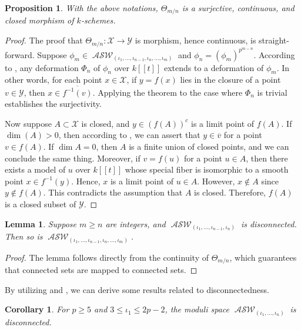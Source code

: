 \documentclass{compositio}
\newtheorem{proposition}[theorem]{Proposition}
\newtheorem{lemma}[theorem]{Lemma}
\newtheorem{corollary}[theorem]{Corollary}
\theoremstyle{remark}
\theoremstyle{remark}
\DeclareMathOperator{\ASW}{\mathcal{ASW}}
\begin{document}
\begin{proposition}
With the above notations, $\Theta_{m/n}$ is a surjective, continuous, and closed morphism of $k$-schemes.
\end{proposition}

\begin{proof}
The proof that $\Theta_{m/n}: \mathscr{X} \xrightarrow{} \mathscr{Y}$ is morphism, hence continuous, is straight-forward. Suppose $\phi_m \in \ASW_{(\iota_1, \ldots, \iota_{n-1}, \iota_n, \ldots, \iota_m)}$ and $\phi_n=(\phi_m)^{p^{m-n}}$. According to \cite[Theorem 1.2]{2020arXiv201013614D}, any deformation $\Phi_n$ of $\phi_n$ over $k[[t]]$ extends to a deformation of $\phi_m$. In other words, for each point $x \in \mathscr{X}$, if $y=f(x)$ lies in the closure of a point $v \in \mathscr{Y}$, then $x \in \overline{f^{-1}(v)}$. Applying the theorem to the case where $\Phi_n$ is trivial establishes the surjectivity.

Now suppose $A\subset \mathscr{X}$ is closed, and $y \in
(f(A))^c$ is a limit point of $f(A)$. If $\dim (A)>0$, then according to \cite[Proposition 3.2]{DANG2020398}, we can assert that $y \in \overline{v}$ for a point $v \in f(A)$. If $\dim A=0$, then $A$ is a finite union of closed points, and we can conclude the same thing. Moreover, if $v=f(u)$ for a point $u \in A$, then there exists a model of $u$ over $k[[t]]$ whose special fiber is isomorphic to a smooth point $x \in f^{-1}(y)$. Hence, $x$ is a limit point of $u \in A$. However, $x \not\in A$ since $y \not\in f(A)$. This contradicts the assumption that $A$ is closed. Therefore, $f(A)$ is a closed subset of $\mathscr{Y}$.
\end{proof}


\begin{lemma}
Suppose $m \ge n$ are integers, and $\ASW_{(\iota_1, \ldots, \iota_{n-1}, \iota_n)}$ is disconnected. Then so is $\ASW_{(\iota_1, \ldots, \iota_{n-1}, \iota_n, \ldots, \iota_m)}$.
\end{lemma}

\begin{proof}
The lemma follows directly from the continuity of $\Theta_{m/n}$, which guarantees that connected sets are mapped to connected sets.
\end{proof}

By utilizing \cite{2020arXiv200203719D} and \cite{DANG2020398}, we can derive some results related to disconnectedness.


\begin{corollary}
    For $p \geq 5$ and $3 \leq \iota_1 \leq 2p-2$, the moduli space $\ASW_{(\iota_1, \ldots, \iota_n)}$ is disconnected.
\end{corollary}
\end{document}
